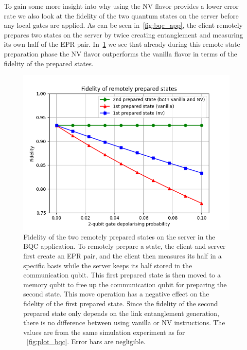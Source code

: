 To gain some more insight into why using the NV flavor provides a lower error rate we also look at the fidelity of the two quantum states on the server before any local gates are applied.
As can be seen in~\cref{fig:bqc_app}, the client remotely prepares two states on the server by twice creating entanglement and measuring its own half of the EPR pair.
In~\cref{fig:plot_bqc_fidelity} we see that already during this remote state preparation phase the NV flavor outperforms the vanilla flavor in terms of the fidelity of the prepared states.

\begin{figure}
  \centering
  \includegraphics[scale=0.8]{figures/netqasm/plots/bqc_sweep_gate_noise_epr_fidelity.png}
  \caption{ Fidelity of the two remotely prepared states on the server in
        the BQC application. To remotely prepare a state, the client and server
        first create an EPR pair, and the client then measures its half in a
        specific basis while the server keeps its half stored in the
        communication qubit. This first prepared state is then moved to a memory
        qubit to free up the communication qubit for preparing the second state.
        This move operation has a negative effect on the fidelity of the first
        prepared state. Since the fidelity of the second prepared state only
        depends on the link entanglement generation, there is no difference
        between using vanilla or NV instructions. The values are from the same
        simulation experiment as for ~\cref{fig:plot_bqc}. Error bars are
        negligible.}
  \label{fig:plot_bqc_fidelity}
\end{figure}

